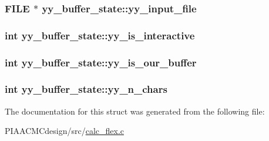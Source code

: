 \hypertarget{structyy__buffer__state_a4360acfb226a1fc240ab2be17dd6beda}{
\subsubsection[{yy\+\_\+input\+\_\+file}]{\setlength{\rightskip}{0pt plus 5cm}F\+I\+L\+E $\ast$ yy\+\_\+buffer\+\_\+state\+::yy\+\_\+input\+\_\+file}}\label{structyy__buffer__state_a4360acfb226a1fc240ab2be17dd6beda}
\hypertarget{structyy__buffer__state_abf5c70eea75581b58c0ee7bd31b14490}{
\subsubsection[{yy\+\_\+is\+\_\+interactive}]{\setlength{\rightskip}{0pt plus 5cm}int yy\+\_\+buffer\+\_\+state\+::yy\+\_\+is\+\_\+interactive}}\label{structyy__buffer__state_abf5c70eea75581b58c0ee7bd31b14490}
\hypertarget{structyy__buffer__state_a80ce2431c70dc4f89ced487f18449465}{
\subsubsection[{yy\+\_\+is\+\_\+our\+\_\+buffer}]{\setlength{\rightskip}{0pt plus 5cm}int yy\+\_\+buffer\+\_\+state\+::yy\+\_\+is\+\_\+our\+\_\+buffer}}\label{structyy__buffer__state_a80ce2431c70dc4f89ced487f18449465}
\hypertarget{structyy__buffer__state_a06406208824817acfec2183b79080945}{
\subsubsection[{yy\+\_\+n\+\_\+chars}]{\setlength{\rightskip}{0pt plus 5cm}int yy\+\_\+buffer\+\_\+state\+::yy\+\_\+n\+\_\+chars}}\label{structyy__buffer__state_a06406208824817acfec2183b79080945}


The documentation for this struct was generated from the following file\+:\begin{DoxyCompactItemize}
\item 
P\+I\+A\+A\+C\+M\+Cdesign/src/\hyperlink{PIAACMCdesign_2src_2calc__flex_8c}{calc\+\_\+flex.\+c}\end{DoxyCompactItemize}
